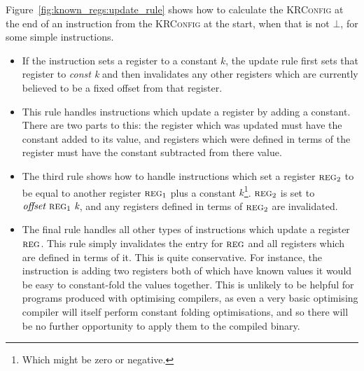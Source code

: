 Figure~\ref{fig:known_regs:update_rule} shows how to calculate the
\textsc{KRConfig} at the end of an instruction from the
\textsc{KRConfig} at the start, when that is not $\bot$, for some
simple instructions.

\begin{itemize}
\item[\circled{1}] If the instruction sets a register to a constant $k$,
  the update rule first sets that register to \textit{const k} and then
  invalidates any other registers which are currently believed to be a
  fixed offset from that register.
\item[\circled{2}] This rule handles instructions which update a
  register by adding a constant.  There are two parts to this: the
  register which was updated must have the constant added to its
  value, and registers which were defined in terms of the register
  must have the constant subtracted from there value.
\item[\circled{3}] The third rule shows how to handle instructions
  which set a register $\textsc{reg}_2$ to be equal to another
  register $\textsc{reg}_1$ plus a constant $k$\footnote{Which might
    be zero or negative.}.  $\textsc{reg}_2$ is set to $\textit{offset
  }\textsc{reg}_1\textit{ k}$, and any registers defined in terms of
  $\textsc{reg}_2$ are invalidated.
\item[\circled{4}] The final rule handles all other types of
  instructions which update a register $\textsc{reg}$.  This rule
  simply invalidates the entry for $\textsc{reg}$ and all registers
  which are defined in terms of it.  This is quite conservative.  For
  instance, the instruction is adding two registers both of which have
  known values it would be easy to constant-fold the values together.
  This is unlikely to be helpful for programs produced with optimising
  compilers, as even a very basic optimising compiler will itself
  perform constant folding optimisations, and so there will be no
  further opportunity to apply them to the compiled binary.
\end{itemize}


